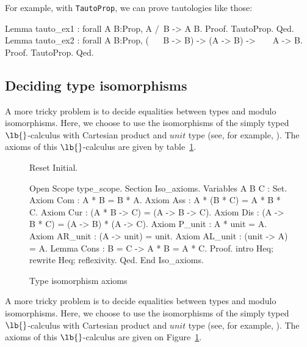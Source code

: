 \begin{coq_example}
For example, with {\tt TautoProp}, we can prove tautologies like
 those:
\begin{coq_example*}
Lemma tauto_ex1 : forall A B:Prop, A /\ B -> A \/ B.
Proof. TautoProp. Qed.
Lemma tauto_ex2 :
   forall A B:Prop, (~ ~ B -> B) -> (A -> B) -> ~ ~ A -> B.
Proof. TautoProp. Qed.
\end{coq_example*}

\subsection{Deciding type isomorphisms}

A more tricky problem is to decide equalities between types and modulo
isomorphisms. Here, we choose to use the isomorphisms of the simply typed
$\lb{}$-calculus with Cartesian product and $unit$ type (see, for example,
\cite{RC95}). The axioms of this $\lb{}$-calculus are given by
table~\ref{isosax}.

\begin{figure}
\begin{centerframe}
\begin{coq_eval}
Reset Initial.
\end{coq_eval}
\begin{coq_example*}
Open Scope type_scope.
Section Iso_axioms.
Variables A B C : Set.
Axiom Com : A * B = B * A.
Axiom Ass : A * (B * C) = A * B * C.
Axiom Cur : (A * B -> C) = (A -> B -> C).
Axiom Dis : (A -> B * C) = (A -> B) * (A -> C).
Axiom P_unit : A * unit = A.
Axiom AR_unit : (A -> unit) = unit.
Axiom AL_unit : (unit -> A) = A.
Lemma Cons : B = C -> A * B = A * C.
Proof.
intro Heq; rewrite Heq; reflexivity.
Qed.
End Iso_axioms.
\end{coq_example*}
\end{centerframe}
\caption{Type isomorphism axioms}
\label{isosax}
\end{figure}

A more tricky problem is to decide equalities between types and modulo
isomorphisms. Here, we choose to use the isomorphisms of the simply typed
$\lb{}$-calculus with Cartesian product and $unit$ type (see, for example,
\cite{RC95}). The axioms of this $\lb{}$-calculus are given on
Figure~\ref{isosax}.


\end{coq_example}
